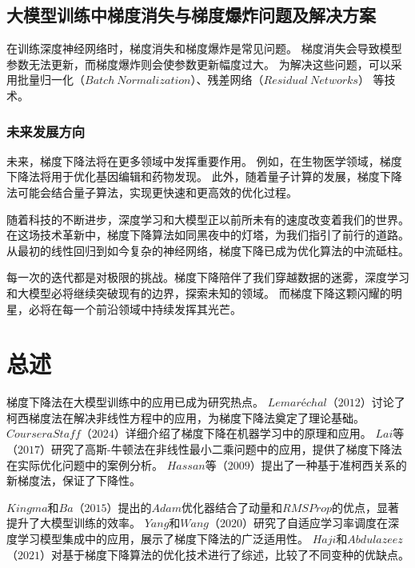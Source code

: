 \documentclass[printMode=false, declarePage=false]{ecnuthesis}
\begin{document}
    \section{大模型训练中梯度消失与梯度爆炸问题及解决方案}
    在训练深度神经网络时，梯度消失和梯度爆炸是常见问题。
    梯度消失会导致模型参数无法更新，而梯度爆炸则会使参数更新幅度过大。
    为解决这些问题，可以采用批量归一化（$Batch\ Normalization$）、残差网络（$Residual\ Networks$）
    等技术\cite{he2016deep, ioffe2015batch}。

    \subsection{未来发展方向}
    未来，梯度下降法将在更多领域中发挥重要作用。
    例如，在生物医学领域，梯度下降法将用于优化基因编辑和药物发现。\cite{gupta2021artificial, choudhuri2023recent}
    此外，随着量子计算的发展，梯度下降法可能会结合量子算法，实现更快速和更高效的优化过程。

    随着科技的不断进步，深度学习和大模型正以前所未有的速度改变着我们的世界。
    在这场技术革新中，梯度下降算法如同黑夜中的灯塔，为我们指引了前行的道路。
    从最初的线性回归到如今复杂的神经网络，梯度下降已成为优化算法的中流砥柱。

    每一次的迭代都是对极限的挑战。梯度下降陪伴了我们穿越数据的迷雾，深度学习和大模型必将继续突破现有的边界，探索未知的领域。
    而梯度下降这颗闪耀的明星，必将在每一个前沿领域中持续发挥其光芒。

    \chapter{总述}

    梯度下降法在大模型训练中的应用已成为研究热点。
    $Lemaréchal$（$2012$）讨论了柯西梯度法在解决非线性方程中的应用，为梯度下降法奠定了理论基础\cite{lemarechal2012cauchy}。
    $Coursera Staff$（$2024$）详细介绍了梯度下降在机器学习中的原理和应用\cite{coursera2024gradientdescent}。
    $Lai$等（$2017$）研究了高斯-牛顿法在非线性最小二乘问题中的应用，提供了梯度下降法在实际优化问题中的案例分析\cite{lai2017solving}。
    $Hassan$等（$2009$）提出了一种基于准柯西关系的新梯度法，保证了下降性\cite{hassan2009new}。

    $Kingma$和$Ba$（$2015$）提出的$Adam$优化器结合了动量和$RMSProp$的优点，显著提升了大模型训练的效率\cite{kingma2015adam}。
    $Yang$和$Wang$（$2020$）研究了自适应学习率调度在深度学习模型集成中的应用，展示了梯度下降法的广泛适用性\cite{yang2020auto}。
    $Haji$和$Abdulazeez$（$2021$）对基于梯度下降算法的优化技术进行了综述，比较了不同变种的优缺点\cite{haji2021comparison}。
    
\end{document}
